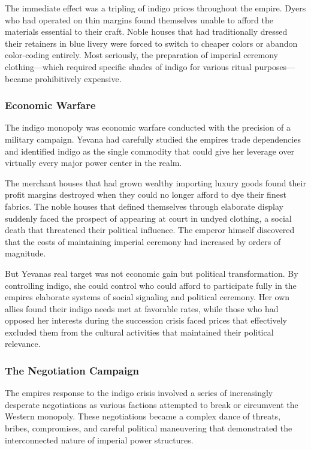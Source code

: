 The immediate effect was a tripling of indigo prices throughout the
empire. Dyers who had operated on thin margins found themselves unable
to afford the materials essential to their craft. Noble houses that had
traditionally dressed their retainers in blue livery were forced to
switch to cheaper colors or abandon color-coding entirely. Most
seriously, the preparation of imperial ceremony clothing---which
required specific shades of indigo for various ritual purposes---became
prohibitively expensive.

\subsubsection{Economic Warfare}\label{economic-warfare}

The indigo monopoly was economic warfare conducted with the precision of
a military campaign. Yevana had carefully studied the
empire\textquotesingle s trade dependencies and identified indigo as the
single commodity that could give her leverage over virtually every major
power center in the realm.

The merchant houses that had grown wealthy importing luxury goods found
their profit margins destroyed when they could no longer afford to dye
their finest fabrics. The noble houses that defined themselves through
elaborate display suddenly faced the prospect of appearing at court in
undyed clothing, a social death that threatened their political
influence. The emperor himself discovered that the costs of maintaining
imperial ceremony had increased by orders of magnitude.

But Yevana\textquotesingle s real target was not economic gain but
political transformation. By controlling indigo, she could control who
could afford to participate fully in the empire\textquotesingle s
elaborate systems of social signaling and political ceremony. Her own
allies found their indigo needs met at favorable rates, while those who
had opposed her interests during the succession crisis faced prices that
effectively excluded them from the cultural activities that maintained
their political relevance.

\subsubsection{The Negotiation Campaign}\label{the-negotiation-campaign}

The empire\textquotesingle s response to the indigo crisis involved a
series of increasingly desperate negotiations as various factions
attempted to break or circumvent the Western monopoly. These
negotiations became a complex dance of threats, bribes, compromises, and
careful political maneuvering that demonstrated the interconnected
nature of imperial power structures.

